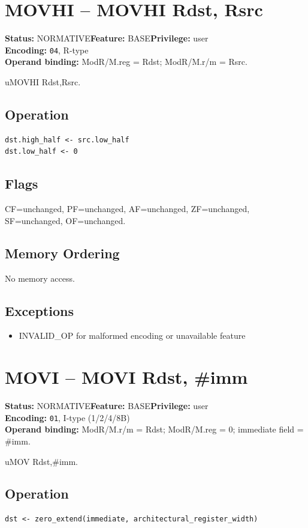 \documentclass[10pt]{article}
\begin{document}
\section{MOVHI -- MOVHI Rdst, Rsrc}
\textbf{Status:} NORMATIVE\quad \textbf{Feature:} BASE\quad \textbf{Privilege:} user\\
\textbf{Encoding:} \texttt{04}, R-type\\
\textbf{Operand binding:} ModR/M.reg = Rdst; ModR/M.r/m = Rsrc.

uMOVHI Rdst,Rsrc.

\subsection*{Operation}
\begin{lstlisting}
dst.high_half <- src.low_half
dst.low_half <- 0
\end{lstlisting}
\subsection*{Flags}
CF=unchanged, PF=unchanged, AF=unchanged, ZF=unchanged, SF=unchanged, OF=unchanged.
\subsection*{Memory Ordering}
No memory access.
\subsection*{Exceptions}
\begin{itemize}
\item INVALID\_OP for malformed encoding or unavailable feature
\end{itemize}
\clearpage

\section{MOVI -- MOVI Rdst, \#imm}
\textbf{Status:} NORMATIVE\quad \textbf{Feature:} BASE\quad \textbf{Privilege:} user\\
\textbf{Encoding:} \texttt{01}, I-type (1/2/4/8B)\\
\textbf{Operand binding:} ModR/M.r/m = Rdst; ModR/M.reg = 0; immediate field = \#imm.

uMOV Rdst,\#imm.

\subsection*{Operation}
\begin{lstlisting}
dst <- zero_extend(immediate, architectural_register_width)
\end{lstlisting}
\end{document}
